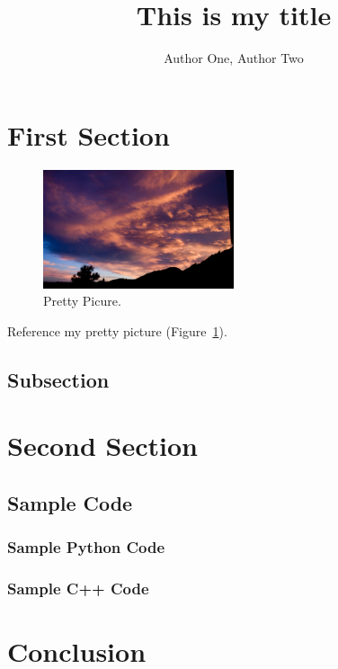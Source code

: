 \documentclass{article}
\begin{document}
\title{This is my title}
\author{Author One, Author Two}
\maketitle

\begin{abstract}
  \lipsum[1]
\end{abstract}

\section{First Section}
\lipsum[1]
\begin{figure}
  \centerline{\includegraphics[width=0.5\textwidth]{common/images/wallpaper/mesa_lab_sunset}}
  \caption{Pretty Picure.\label{fig:pretty}}
\end{figure}
Reference my pretty picture (Figure~\ref{fig:pretty}).

\subsection{Subsection}
\lipsum[2-3]

\section{Second Section}
\lipsum[4]
\subsection{Sample Code}

\subsubsection{Sample Python Code}


\subsubsection{Sample C++ Code}


\section{Conclusion}
\lipsum[5-6]
\clearpage
\layout
\end{document}
